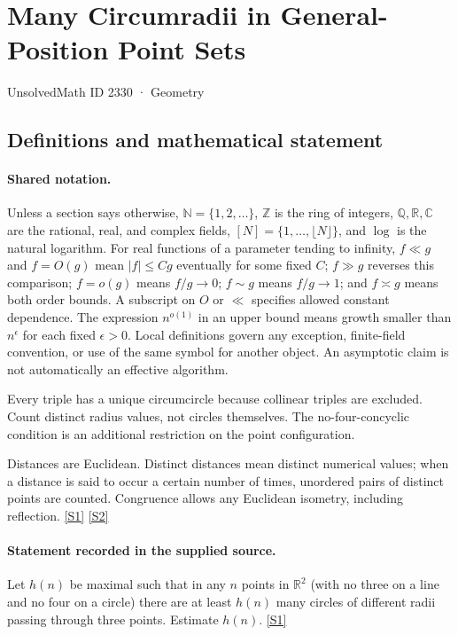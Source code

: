 \documentclass[11pt,a4paper]{article}
\newcommand{\N}{\mathbb{N}}
\newcommand{\Z}{\mathbb{Z}}
\newcommand{\Q}{\mathbb{Q}}
\newcommand{\R}{\mathbb{R}}
\newcommand{\C}{\mathbb{C}}
\newcommand{\sref}[2]{\hyperlink{source:#1:#2}{[S#2]}}
\begin{document}

\setcounter{section}{2329}

\section{Many Circumradii in General-Position Point Sets}\label{2330}

{\small\sffamily UnsolvedMath ID 2330 · Geometry}

\subsection{Definitions and mathematical statement}

\paragraph{Shared notation.}Unless a section says otherwise, $\N=\{1,2,\ldots\}$,
$\Z$ is the ring of integers, $\Q,\R,\C$ are the rational, real, and complex
fields, $[N]=\{1,\ldots,\lfloor N\rfloor\}$, and $\log$ is the natural
logarithm. For real functions of a parameter tending to infinity,
$f\ll g$ and $f=O(g)$ mean $|f|\leq Cg$ eventually for some fixed $C$;
$f\gg g$ reverses this comparison; $f=o(g)$ means $f/g\to0$;
$f\sim g$ means $f/g\to1$; and $f\asymp g$ means both order bounds.
A subscript on $O$ or $\ll$ specifies allowed constant dependence.
The expression $n^{o(1)}$ in an upper bound means growth smaller than
$n^\epsilon$ for each fixed $\epsilon>0$. Local definitions govern any
exception, finite-field convention, or use of the same symbol for another
object. An asymptotic claim is not automatically an effective algorithm.



Every triple has a unique circumcircle because collinear triples are excluded. Count distinct radius values, not circles themselves. The no-four-concyclic condition is an additional restriction on the point configuration.

Distances are Euclidean. Distinct distances mean distinct numerical values; when a distance is said to occur a certain number of times, unordered pairs of distinct points are counted. Congruence allows any Euclidean isometry, including reflection. \sref{2330}{1} \sref{2330}{2}

\paragraph{Statement recorded in the supplied source.}
Let $h(n)$ be maximal such that in any $n$ points in $\mathbb{R}^2$ (with no three on a line and no four on a circle) there are at least $h(n)$ many circles of different radii passing through three points. Estimate $h(n)$. \sref{2330}{1}
\end{document}
